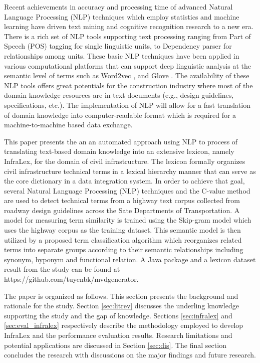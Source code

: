 \documentclass[Journal,InsideFigs, DoubleSpace]{ascelike} %
\begin{document}
Recent achievements in accuracy and processing time of advanced Natural Language Processing (NLP) techniques which employ statistics and machine learning have driven text mining and cognitive recognition research to a new era. There is a rich set of NLP tools supporting text processing ranging from  Part of Speech (POS) tagging \cite{Toutanova03,Cunningham02} for single linguistic units, to Dependency parser \cite{chen14} for relationships among units. These basic NLP techniques have been applied in various computational platforms that can support deep linguistic analysis at the semantic level of terms such as Word2vec \cite{mikolov13a}, and Glove \cite{pennington2014glove}. The availability of these NLP tools offers great potentials for the construction industry where most of the domain knowledge resources are in text documents (e.g., design guidelines, specifications, etc.). The implementation of NLP will allow for a fast translation of domain knowledge into computer-readable format which is required for a machine-to-machine based data exchange.
\par
This paper presents the an an automated approach using NLP to process of translating text-based domain knowledge into an extensive lexicon, namely InfraLex, for the domain of civil infrastructure. The lexicon formally organizes civil infrastructure technical terms in a lexical hierarchy manner that can serve as the core dictionary in a data integration system. In order to achieve that goal, several Natural Language Processing (NLP) techniques and the C-value method \cite{frantzi20} are used to detect technical terms from a highway text corpus collected from roadway design guidelines across the Sate Departments of Transportation. A model for measuring term similarity is trained using the Skip-gram model \cite{mikolov13a} which uses the highway corpus as the training dataset. This semantic model is then utilized by a proposed term classification algorithm which reorganizes related terms into separate groups according to their semantic relationships including synonym, hyponym and functional relation. A Java package and a lexicon dataset result from the study can be found at https://github.com/tuyenbk/mvdgenerator.
%
\par
The paper is organized as follows. This section presents the background and rationale for the study. Section \ref{sec:litrev} discusses the underling knowledge supporting the study and the gap of knowledge. Sections \ref{sec:infralex} and \ref{sec:eval_infralex} respectively describe the methodology employed to develop InfraLex and the performance evaluation results. Research limitations and potential applications are discussed in Section \ref{sec:dis}. The final section concludes the research with discussions on the major findings and future research.
% 
\end{document}
